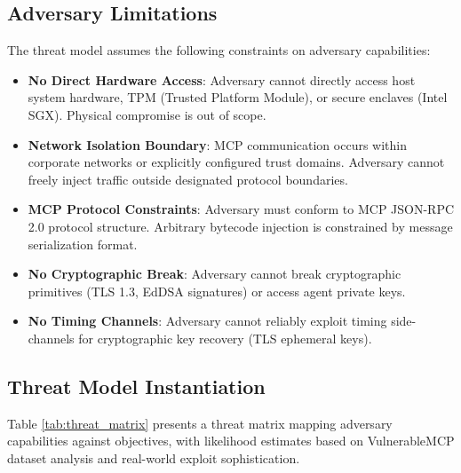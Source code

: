 \documentclass[12pt,twocolumn,journal]{IEEEtran}
\begin{document}
\subsection{Adversary Limitations}

The threat model assumes the following constraints on adversary capabilities:

\begin{itemize}
\item \textbf{No Direct Hardware Access}: Adversary cannot directly access host system hardware, TPM (Trusted Platform Module), or secure enclaves (Intel SGX). Physical compromise is out of scope.
\item \textbf{Network Isolation Boundary}: MCP communication occurs within corporate networks or explicitly configured trust domains. Adversary cannot freely inject traffic outside designated protocol boundaries.
\item \textbf{MCP Protocol Constraints}: Adversary must conform to MCP JSON-RPC 2.0 protocol structure. Arbitrary bytecode injection is constrained by message serialization format.
\item \textbf{No Cryptographic Break}: Adversary cannot break cryptographic primitives (TLS 1.3, EdDSA signatures) or access agent private keys.
\item \textbf{No Timing Channels}: Adversary cannot reliably exploit timing side-channels for cryptographic key recovery (TLS ephemeral keys).
\end{itemize}

\subsection{Threat Model Instantiation}

Table \ref{tab:threat_matrix} presents a threat matrix mapping adversary capabilities against objectives, with likelihood estimates based on VulnerableMCP dataset analysis and real-world exploit sophistication.
\end{document}
